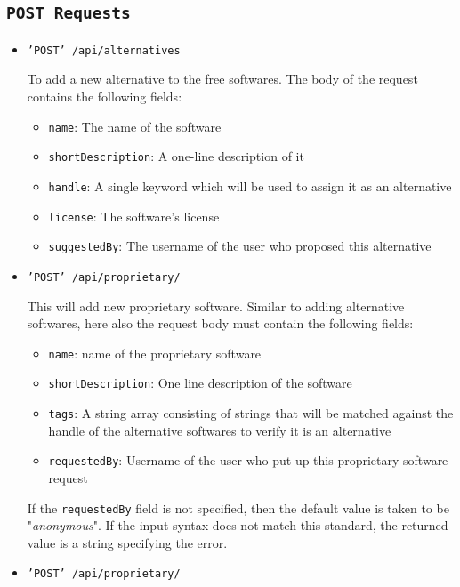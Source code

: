 \subsection{\texttt{POST Requests}}

\begin{itemize}

\item{\texttt{'POST' /api/alternatives}}

To add a new alternative to the free softwares. The body of the request contains the following fields:

\begin{itemize}
\item \texttt{name}: The name of the software
\item \texttt{shortDescription}: A one-line description of it
\item \texttt{handle}: A single keyword which will be used to assign it as an alternative
\item \texttt{license}: The software's license
\item \texttt{suggestedBy}: The username of the user who proposed this alternative
\end{itemize}

\item{\texttt{'POST' /api/proprietary/}}

This will add new proprietary software. Similar to adding alternative softwares, here also the request body must contain the following fields:
\begin{itemize}
\item \texttt{name}: name of the proprietary software
\item \texttt{shortDescription}: One line description of the software
\item \texttt{tags}: A string array consisting of strings that will be matched against the handle of the alternative softwares to verify it is an alternative
\item \texttt{requestedBy}: Username of the user who put up this proprietary software request
\end{itemize}

If the \texttt{requestedBy} field is not specified, then the default value is taken to be "\textsl{anonymous}". If the input syntax does not match this standard, the returned value is a string specifying the error.



\item{\texttt{'POST' /api/proprietary/}}


\end{itemize}
